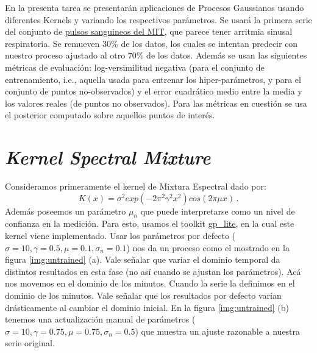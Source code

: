 \documentclass[letterpaper,11pt,oneside]{article}
\theoremstyle{break}
\begin{document}
	





\inserttitle

En la presenta tarea se presentarán aplicaciones de Procesos Gaussianos usando diferentes Kernels y variando los respectivos parámetros. Se usará la primera serie del conjunto de \href{https://ecg.mit.edu/time-series/}{pulsos sanguineos del MIT}, que parece tener arritmia sinusal respiratoria. Se remueven 30\% de los datos, los cuales se intentan predecir con nuestro proceso ajustado al otro 70\% de los datos. Además se usan las siguientes métricas de evaluación: log-versimilitud negativa (para el conjunto de entrenamiento, i.e., aquella usada para entrenar los hiper-parámetros, y para el conjunto de puntos no-observados) y el error cuadrático medio entre la media y los valores reales (de puntos no observados). Para las métricas en cuestión se usa el posterior computado sobre aquellos puntos de interés.

\section{\textit{Kernel Spectral Mixture}}
Consideramos primeramente el kernel de Mixtura Espectral dado por: 
$$K(x)=\sigma^2 exp(-2\pi^2\gamma^2x^2)cos(2\pi\mu x)\,.$$
Además poseemos un parámetro $\mu_n$ que puede interpretarse como un nivel de confianza en la medición. Para esto, usamos el toolkit \href{https://github.com/GAMES-UChile/The_Art_of_Gaussian_Processes}{gp\_lite}, en la cual este kernel viene implementado. Usar los parámetros por defecto ($\sigma = 10, \gamma = 0.5, \mu = 0.1, \sigma_n = 0.1$) nos da un proceso como el mostrado en la figura \ref{img:untrained} (a). Vale señalar que variar el dominio temporal da distintos resultados en esta fase (no así cuando se ajustan los parámetros). Acá nos movemos en el dominio de los minutos. Cuando la serie la definimos en el dominio de los minutos. Vale señalar que los resultados por defecto varían drásticamente al cambiar el dominio inicial. En la figura \ref{img:untrained} (b) tenemos una actualización manual de parámetros ($\sigma = 10, \gamma = 0.75, \mu = 0.75, \sigma_n = 0.5$) que muestra un ajuste razonable a nuestra serie original.
\end{document}
